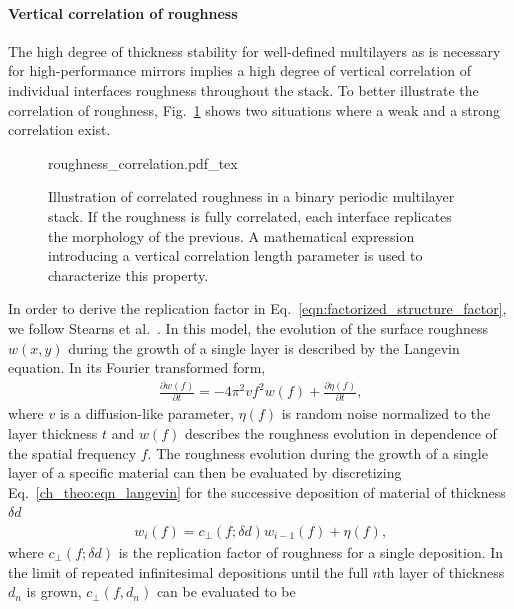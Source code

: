\paragraph{Vertical correlation of roughness}
The high degree of thickness stability for well-defined multilayers as is necessary for high-performance mirrors implies a high degree of vertical correlation of individual interfaces roughness throughout the stack. To better illustrate the correlation of roughness, Fig.~\ref{ch_theo:fig_vertical_roughness_correlation} shows two situations where a weak and a strong correlation exist.
\begin{figure}[htb]
    \def\svgwidth{\textwidth}
    {roughness_correlation.pdf_tex}
    \caption[Illustration of correlated roughness in a binary periodic multilayer stack.]{Illustration of correlated roughness in a binary periodic multilayer stack. If the roughness is fully correlated, each interface replicates the morphology of the previous. A mathematical expression introducing a vertical correlation length parameter is used to characterize this property.}
    \label{ch_theo:fig_vertical_roughness_correlation}
\end{figure}
In order to derive the replication factor in Eq.~\eqref{eqn:factorized_structure_factor}, we follow Stearns et al.~\cite{stearns_x-ray_1992}. In this model, the evolution of the surface roughness $w(x,y)$ during the growth of a single layer is described by the Langevin equation. In its Fourier transformed form, 
\begin{align}
\frac{\partial w(f)}{\partial t} = - 4 \pi^2 v f^2 w(f) + \frac{\partial \eta(f)}{\partial t} \text{,} \label{ch_theo:eqn_langevin}
\end{align}
where $v$ is a diffusion-like parameter, $\eta(f)$ is random noise normalized to the layer thickness $t$ and $w(f)$ describes the roughness evolution in dependence of the spatial frequency $f$. The roughness evolution during the growth of a single layer of a specific material can then be evaluated by discretizing Eq.~\eqref{ch_theo:eqn_langevin} for the successive deposition of material of thickness $\delta d$
\begin{align}
w_i(f) = c_\perp(f;\delta d) w_{i-1}(f) + \eta(f) \text{,}
\end{align}
where $c_\perp(f;\delta d)$ is the replication factor of roughness for a single deposition. In the limit of repeated infinitesimal depositions until the full $n$th layer of thickness $d_n$ is grown, $c_\perp(f,d_n)$ can be evaluated to be \cite{spiller_multilayer_1993}
